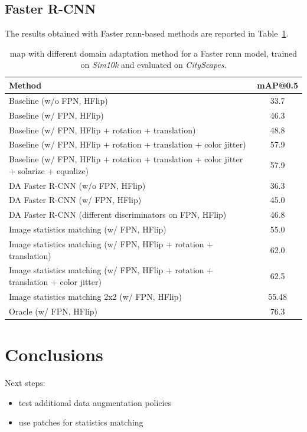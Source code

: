 \documentclass[%
    corpo=12pt,
    twoside,
    stile=classica,   
    tipotesi=magistrale,
    evenboxes,
    english,
	numerazioneromana,
]{toptesi}
\begin{document}
\section{Faster R-CNN}
The results obtained with Faster \gls{rcnn}-based methods are reported in Table~\ref{table:fasterrcnn}.

\begin{table}[ht!]
	\centering
	\begin{tabularx}{\linewidth}{|X|c|}
		\hline
		Method  &   mAP@0.5 \\
		\hline\hline
		Baseline (w/o FPN, HFlip)       &   33.7\cite{abramov2020simple}   \\
		\hline
		Baseline (w/ FPN, HFlip)       &   46.3   \\
		\hline
		Baseline (w/ FPN, HFlip + rotation + translation)       &   48.8   \\
		\hline
		Baseline (w/ FPN, HFlip + rotation + translation + color jitter)       &   57.9  \\
		\hline
		Baseline (w/ FPN, HFlip + rotation + translation + color jitter + solarize + equalize)       &   57.9   \\
		\hline
		DA Faster R-CNN (w/o FPN, HFlip)    & 36.3     \\
		\hline
		DA Faster R-CNN (w/ FPN, HFlip)    & 45.0     \\
 		\hline
 		DA Faster R-CNN (different discriminators on FPN, HFlip)     &   46.8    \\
		\hline
		Image statistics matching (w/ FPN, HFlip)  &   55.0    \\
		\hline
		Image statistics matching (w/ FPN, HFlip + rotation + translation) &   62.0    \\
		\hline
		Image statistics matching (w/ FPN, HFlip + rotation + translation + color jitter) &   62.5    \\
		\hline\hline
		Image statistics matching 2x2 (w/ FPN, HFlip) &   55.48    \\
		\hline\hline
		Oracle (w/ FPN, HFlip) &   76.3    \\
		\hline
	\end{tabularx}
	\caption{\gls{map} with different domain adaptation method for a Faster \gls{rcnn} model, trained on \textit{Sim10k} and evaluated on \textit{CityScapes}.}
	\label{table:fasterrcnn}
\end{table}

\chapter{Conclusions}
Next steps:
\begin{itemize}
	\item test additional data augmentation policies
	\item use patches for statistics matching
\end{itemize}

\backmatter
\english
\printbibliography[heading=bibintoc]

\end{document}
